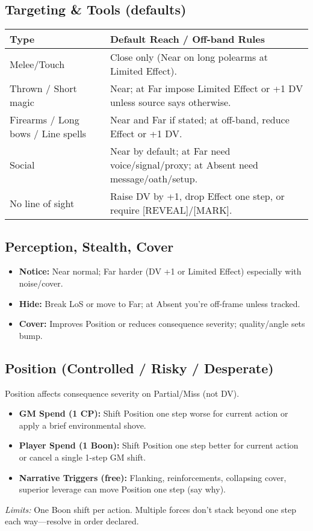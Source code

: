 \subsection{Targeting \& Tools (defaults)}
\begin{center}
\begin{tabular}{@{}lp{10.5cm}@{}}
\toprule
\textbf{Type} & \textbf{Default Reach / Off-band Rules} \\
\midrule
Melee/Touch & Close only (Near on long polearms at Limited Effect). \\
Thrown / Short magic & Near; at Far impose Limited Effect or +1 DV unless source says otherwise. \\
Firearms / Long bows / Line spells & Near and Far if stated; at off-band, reduce Effect or +1 DV. \\
Social & Near by default; at Far need voice/signal/proxy; at Absent need message/oath/setup. \\
No line of sight & Raise DV by +1, drop Effect one step, or require [REVEAL]/[MARK]. \\
\bottomrule
\end{tabular}
\end{center}

\subsection{Perception, Stealth, Cover}
\begin{itemize}
  \item \textbf{Notice:} Near normal; Far harder (DV +1 or Limited Effect) especially with noise/cover.
  \item \textbf{Hide:} Break LoS or move to Far; at Absent you're off-frame unless tracked.
  \item \textbf{Cover:} Improves Position or reduces consequence severity; quality/angle sets bump.
\end{itemize}

\subsection{Position (Controlled / Risky / Desperate)}
Position affects consequence severity on Partial/Miss (not DV).
\begin{itemize}
  \item \textbf{GM Spend (1 CP):} Shift Position one step worse for current action or apply a brief environmental shove.
  \item \textbf{Player Spend (1 Boon):} Shift Position one step better for current action or cancel a single 1-step GM shift.
  \item \textbf{Narrative Triggers (free):} Flanking, reinforcements, collapsing cover, superior leverage can move Position one step (say why).
\end{itemize}
\emph{Limits:} One Boon shift per action. Multiple forces don't stack beyond one step each way—resolve in order declared.

